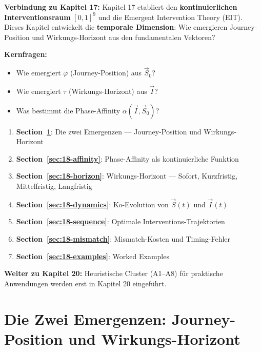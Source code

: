 \begin{tcolorbox}[colback=green!5!white, colframe=green!75!black,
    title=Chapter Overview]

\textbf{Verbindung zu Kapitel 17:} Kapitel 17 etabliert den \textbf{kontinuierlichen Interventionsraum} $[0,1]^9$ und die Emergent Intervention Theory (EIT). Dieses Kapitel entwickelt die \textbf{temporale Dimension}: Wie emergieren Journey-Position und Wirkungs-Horizont aus den fundamentalen Vektoren?

\textbf{Kernfragen:}
\begin{itemize}[nosep]
    \item Wie emergiert $\varphi$ (Journey-Position) aus $\vec{S}_0$?
    \item Wie emergiert $\tau$ (Wirkungs-Horizont) aus $\vec{I}$?
    \item Was bestimmt die Phase-Affinity $\alpha(\vec{I}, \vec{S}_0)$?
\end{itemize}

\begin{enumerate}
\item \textbf{Section~\ref{sec:18-emergence}}: Die zwei Emergenzen --- Journey-Position und Wirkungs-Horizont
\item \textbf{Section~\ref{sec:18-affinity}}: Phase-Affinity als kontinuierliche Funktion
\item \textbf{Section~\ref{sec:18-horizon}}: Wirkungs-Horizont --- Sofort, Kurzfristig, Mittelfristig, Langfristig
\item \textbf{Section~\ref{sec:18-dynamics}}: Ko-Evolution von $\vec{S}(t)$ und $\vec{I}(t)$
\item \textbf{Section~\ref{sec:18-sequence}}: Optimale Interventions-Trajektorien
\item \textbf{Section~\ref{sec:18-mismatch}}: Mismatch-Kosten und Timing-Fehler
\item \textbf{Section~\ref{sec:18-examples}}: Worked Examples
\end{enumerate}

\textbf{Weiter zu Kapitel 20:} Heuristische Cluster (A1--A8) für praktische Anwendungen werden erst in Kapitel 20 eingeführt.
\end{tcolorbox}


\section{Die Zwei Emergenzen: Journey-Position und Wirkungs-Horizont}
\label{sec:18-emergence}

